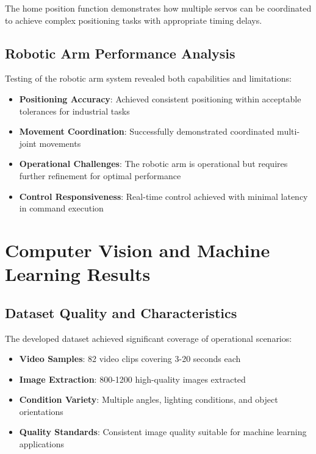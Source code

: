 \documentclass{book}
\begin{document}


\par\noindent The home position function demonstrates how multiple servos can be coordinated to achieve complex positioning tasks with appropriate timing delays.

\subsection{Robotic Arm Performance Analysis}

\par\noindent Testing of the robotic arm system revealed both capabilities and limitations:

\begin{itemize}
\item \textbf{Positioning Accuracy}: Achieved consistent positioning within acceptable tolerances for industrial tasks
\item \textbf{Movement Coordination}: Successfully demonstrated coordinated multi-joint movements
\item \textbf{Operational Challenges}: The robotic arm is operational but requires further refinement for optimal performance
\item \textbf{Control Responsiveness}: Real-time control achieved with minimal latency in command execution
\end{itemize}

\section{Computer Vision and Machine Learning Results}

\subsection{Dataset Quality and Characteristics}

\par\noindent The developed dataset achieved significant coverage of operational scenarios:

\begin{itemize}
\item \textbf{Video Samples}: 82 video clips covering 3-20 seconds each
\item \textbf{Image Extraction}: 800-1200 high-quality images extracted
\item \textbf{Condition Variety}: Multiple angles, lighting conditions, and object orientations
\item \textbf{Quality Standards}: Consistent image quality suitable for machine learning applications
\end{itemize}
\end{document}
